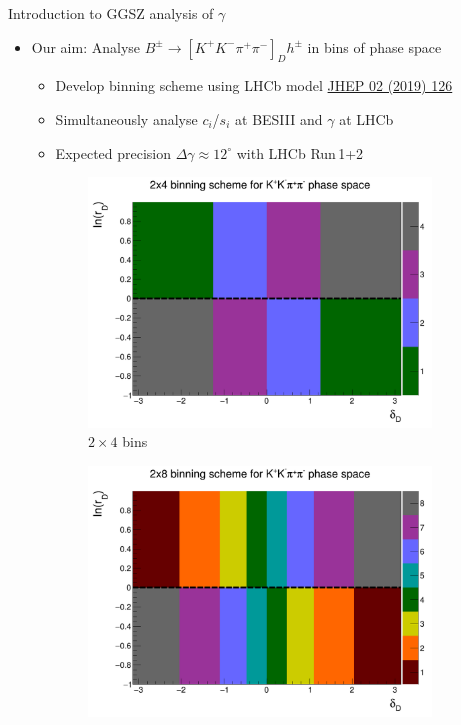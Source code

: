 \documentclass{beamer}
\begin{document}
\begin{frame}{Introduction to GGSZ analysis of $\gamma$}
  \begin{itemize}
    \setlength\itemsep{0.5em}
    \item{Our aim: Analyse $B^\pm\to[K^+K^-\pi^+\pi^-]_D h^\pm$ in bins of phase space}
    \begin{itemize}
    \setlength\itemsep{0.5em}
      \item{Develop binning scheme using LHCb model \href{https://arxiv.org/abs/1811.08304}{JHEP 02 (2019) 126}}
      \item{Simultaneously analyse $c_i$/$s_i$ at BESIII and $\gamma$ at LHCb}
      \item{Expected precision $\Delta\gamma\approx 12^\circ$ with LHCb Run\,1+2}
    \end{itemize}
  \end{itemize}
  \begin{figure}
    \centering
    \begin{subfigure}{0.5\textwidth}
      \centering
      \includegraphics[width=1.0\textwidth]{Plots/BinningSchemePlot_4Bins.png}
      \caption{$2\times 4$ bins}
    \end{subfigure}%
    \begin{subfigure}{0.5\textwidth}
      \centering
      \includegraphics[width=1.0\textwidth]{Plots/BinningSchemePlot_8Bins.png}

\end{subfigure}
\end{figure}
\end{frame}
\end{document}

